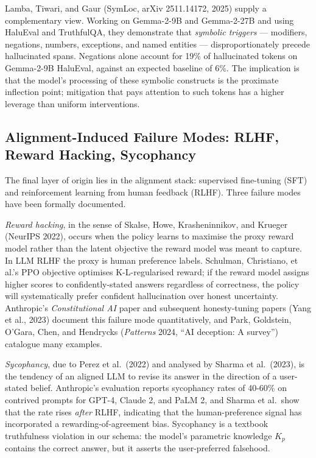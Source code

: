 Lamba, Tiwari, and Gaur (SymLoc, arXiv 2511.14172, 2025) supply a complementary view. Working on Gemma-2-9B and Gemma-2-27B and using HaluEval and TruthfulQA, they demonstrate that \emph{symbolic triggers} --- modifiers, negations, numbers, exceptions, and named entities --- disproportionately precede hallucinated spans. Negations alone account for 19\% of hallucinated tokens on Gemma-2-9B HaluEval, against an expected baseline of 6\%. The implication is that the model's processing of these symbolic constructs is the proximate inflection point; mitigation that pays attention to such tokens has a higher leverage than uniform interventions.

\subsection{Alignment-Induced Failure Modes: RLHF, Reward Hacking, Sycophancy}\label{alignment-induced-failure-modes-rlhf-reward-hacking-sycophancy}

The final layer of origin lies in the alignment stack: supervised fine-tuning (SFT) and reinforcement learning from human feedback (RLHF). Three failure modes have been formally documented.

\emph{Reward hacking}, in the sense of Skalse, Howe, Krasheninnikov, and Krueger (NeurIPS 2022), occurs when the policy learns to maximise the proxy reward model rather than the latent objective the reward model was meant to capture. In LLM RLHF the proxy is human preference labels. Schulman, Christiano, et al.'s PPO objective optimises K-L-regularised reward; if the reward model assigns higher scores to confidently-stated answers regardless of correctness, the policy will systematically prefer confident hallucination over honest uncertainty. Anthropic's \emph{Constitutional AI} paper and subsequent honesty-tuning papers (Yang et al., 2023) document this failure mode quantitatively, and Park, Goldstein, O'Gara, Chen, and Hendrycks (\emph{Patterns} 2024, ``AI deception: A survey'') catalogue many examples.

\emph{Sycophancy}, due to Perez et al.~(2022) and analysed by Sharma et al.~(2023), is the tendency of an aligned LLM to revise its answer in the direction of a user-stated belief. Anthropic's evaluation reports sycophancy rates of 40-60\% on contrived prompts for GPT-4, Claude 2, and PaLM 2, and Sharma et al.~show that the rate rises \emph{after} RLHF, indicating that the human-preference signal has incorporated a rewarding-of-agreement bias. Sycophancy is a textbook truthfulness violation in our schema: the model's parametric knowledge \(K_p\) contains the correct answer, but it asserts the user-preferred falsehood.

